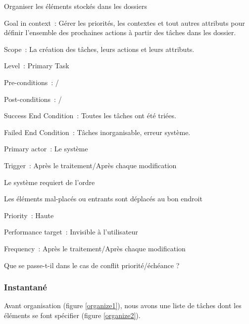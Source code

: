 \begin{usecase}{Organiser les éléments stockés dans les dossiers}
\begin{information}
\item[Goal in context~:] Gérer les priorités, les contextes et tout autres attributs pour définir l'ensemble des prochaines actions à partir des tâches dans les dossier.
\item[Scope~:] La création des tâches, leurs actions et leurs attributs.
\item[Level~:] Primary Task
\item[Pre-conditions~:] /
\item[Post-conditions~:] /
\item[Success End Condition~:] Toutes les tâches ont été triées.
\item[Failed End Condition~:] Tâches inorganisable, erreur système.
\item[Primary actor~:] Le système
\item[Trigger~:] Après le traitement/Après chaque modification
\\
\end{information}
\begin{scenario}
\item Le système requiert de l'ordre
\item Les éléments mal-placés ou entrants sont déplacés au bon endroit
\\
\end{scenario}
\begin{relatedinformation}
\item[Priority~:] Haute
\item[Performance target~:] Invisible à l'utilisateur
\item[Frequency~:] Après le traitement/Après chaque modification
\\
\end{relatedinformation}
\begin{openissues}
\item Que se passe-t-il dans le cas de conflit priorité/échéance ?
\\
\end{openissues}
\end{usecase}


\subsubsection{Instantané}

Avant organisation (figure \ref{organize1}), nous avons une liste de tâches dont les éléments se font spécifier (figure \ref{organize2}).

